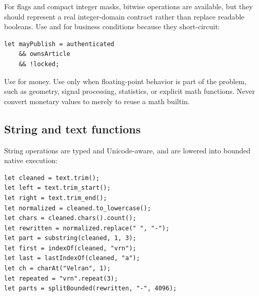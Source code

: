 For flags and compact integer masks, bitwise operations are available, but they should represent a real integer-domain contract rather than replace readable booleans. Use \code{&&} and \code{||} for business conditions because they short-circuit:

\begin{lstlisting}[language=Velran]
let mayPublish = authenticated
    && ownsArticle
    && !locked;
\end{lstlisting}

Use  for money. Use  only when floating-point behavior is part of the problem, such as geometry, signal processing, statistics, or explicit math functions. Never convert monetary values to  merely to reuse a math builtin.

\subsection*{String and text functions}

String operations are typed and Unicode-aware, and are lowered into bounded native execution:

\begin{lstlisting}[language=Velran]
let cleaned = text.trim();
let left = text.trim_start();
let right = text.trim_end();
let normalized = cleaned.to_lowercase();
let chars = cleaned.chars().count();
let rewritten = normalized.replace(" ", "-");
let part = substring(cleaned, 1, 3);
let first = indexOf(cleaned, "vrn");
let last = lastIndexOf(cleaned, "a");
let ch = charAt("Velran", 1);
let repeated = "vrn".repeat(3);
let parts = splitBounded(rewritten, "-", 4096);
\end{lstlisting}

